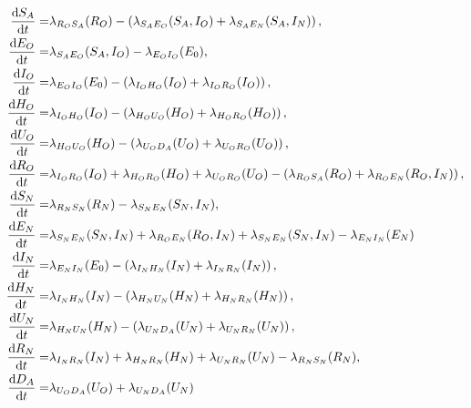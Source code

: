 \begin{equation}
\begin{aligned}
\frac{\mathrm{d} S_A}{\mathrm{d} t}    =&  \lambda_{R_O S_A}(R_O) - \left( \lambda_{S_A E_O}(S_A, I_O) + \lambda_{S_A E_N}(S_A, I_N) \right), \\
\frac{\mathrm{d} E_O}{\mathrm{d} t}    =&  \lambda_{S_A E_O}(S_A, I_O) - \lambda_{E_O I_O}(E_0),    \\
\frac{\mathrm{d} I_O}{\mathrm{d} t}    =&  \lambda_{E_O I_O}(E_0) - \left( \lambda_{I_O H_O}(I_O)  + \lambda_{I_O R_O}(I_O) \right),\\
\frac{\mathrm{d} H_O}{\mathrm{d} t}    =&  \lambda_{I_O H_O}(I_O) - \left( \lambda_{H_O U_O}(H_O)  +  \lambda_{H_O R_O}(H_O) \right),\\
\frac{\mathrm{d} U_O}{\mathrm{d} t}    =&  \lambda_{H_O U_O}(H_O) - \left( \lambda_{U_O D_A}(U_O)  + \lambda_{U_O R_O}(U_O) \right),\\
\frac{\mathrm{d} R_O}{\mathrm{d} t}    =&  \lambda_{I_O R_O}(I_O) + \lambda_{H_O R_O}(H_O) + \lambda_{U_O R_O}(U_O) - \left( \lambda_{R_O S_A}(R_O) + \lambda_{R_O E_N}(R_O, I_N) \right),    \\
\frac{\mathrm{d} S_N}{\mathrm{d} t}    =&  \lambda_{R_N S_N}(R_N) - \lambda_{S_N E_N}(S_N, I_N), \\
\frac{\mathrm{d} E_N}{\mathrm{d} t}    =&  \lambda_{S_N E_N}(S_N, I_N) + \lambda_{R_O E_N}(R_O, I_N) + \lambda_{S_N E_N}(S_N, I_N) - \lambda_{E_N I_N}(E_N)\,    \\
\frac{\mathrm{d} I_N}{\mathrm{d} t}    =&  \lambda_{E_N I_N}(E_0) - \left( \lambda_{I_N H_N}(I_N)  + \lambda_{I_N R_N}(I_N) \right),\\
\frac{\mathrm{d} H_N}{\mathrm{d} t}    =&  \lambda_{I_N H_N}(I_N) - \left( \lambda_{H_N U_N}(H_N)  +  \lambda_{H_N R_N}(H_N) \right),\\
\frac{\mathrm{d} U_N}{\mathrm{d} t}    =&  \lambda_{H_N U_N}(H_N) - \left( \lambda_{U_N D_A}(U_N)  + \lambda_{U_N R_N}(U_N) \right),\\
\frac{\mathrm{d} R_N}{\mathrm{d} t}    =&  \lambda_{I_N R_N}(I_N) + \lambda_{H_N R_N}(H_N) + \lambda_{U_N R_N}(U_N) - \lambda_{R_N S_N}(R_N),    \\
\frac{\mathrm{d} D_A}{\mathrm{d} t}    =&  \lambda_{U_O D_A}(U_O) + \lambda_{U_N D_A}(U_N) \\
\label{ch_5:eqn:ODEs_simulation_model}
\end{aligned}
\end{equation}

